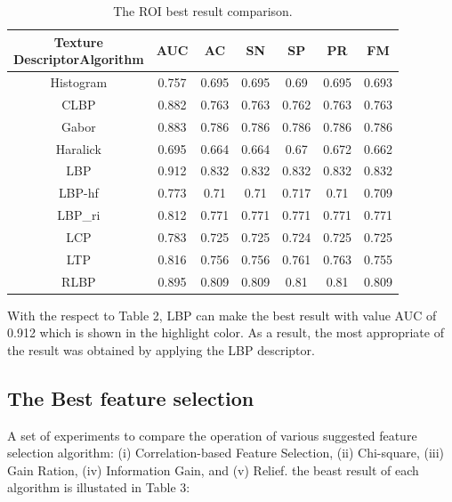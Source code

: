 \documentclass[review]{elsarticle}
\begin{document}
\begin{table}[h!]
	\centering
	\begin{tabular}{|c|c|c|c|c|c|c|}
		\hline 
		\backslashbox{Texture \\ Descriptor}{Algorithm} &AUC&AC&SN&SP&PR&FM\\
		\hline 
		Histogram	& 0.757 & 0.695  & 0.695 &0.69  &0.695  & 0.693 \\ 
		\hline 
		CLBP		& 0.882 & 0.763 & 0.763 &0.762  &0.763  &0.763  \\ 
		\hline 
		Gabor		&0.883  &0.786  &0.786  &0.786  &0.786  &0.786  \\ 
		\hline 
		Haralick 	&0.695  &0.664  &0.664  &0.67  &0.672  &0.662  \\ 
		\hline 
	\cellcolor{blue!25}	LBP 		&\cellcolor{blue!25}0.912  &\cellcolor{blue!25}0.832  &\cellcolor{blue!25}0.832  &\cellcolor{blue!25}0.832  &\cellcolor{blue!25}0.832  &\cellcolor{blue!25}0.832  \\ 
		\hline
		LBP-hf 		&0.773  &0.71  &0.71  &0.717  &0.71  &0.709  \\ 
		\hline
	    LBP\_ri 	&0.812  &0.771  &0.771  &0.771  &0.771  &0.771  \\ 
		\hline
		LCP		 	&0.783  &0.725  &0.725  &0.724  &0.725  &0.725  \\ 
		\hline
		LTP		 	&0.816  &0.756  &0.756  &0.761  &0.763  &0.755  \\ 
		\hline
		RLBP	 	&0.895  &0.809  &0.809  &0.81  &0.81  &0.809  \\ 
		\hline
	\end{tabular} 
	\caption{The ROI best result comparison. }
\end{table}
With the respect to Table 2, LBP can make the best result with value AUC of 0.912 which is shown in the highlight color. As a result, the most appropriate of the result was obtained by applying the LBP descriptor.  

\subsection{The Best feature selection}
A set of experiments to compare the operation of various suggested feature selection algorithm: (i) Correlation-based Feature Selection, (ii) Chi-square, (iii) Gain Ration, (iv) Information Gain, and (v) Relief. the beast result of each algorithm is illustated in  Table 3:  
\end{document}
